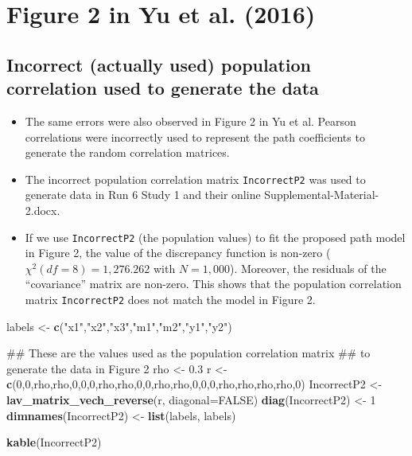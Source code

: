 \documentclass[]{article}
\newenvironment{Shaded}{\begin{snugshade}}{\end{snugshade}}
\newcommand{\KeywordTok}[1]{\textcolor[rgb]{0.13,0.29,0.53}{\textbf{#1}}}
\newcommand{\DataTypeTok}[1]{\textcolor[rgb]{0.13,0.29,0.53}{#1}}
\newcommand{\DecValTok}[1]{\textcolor[rgb]{0.00,0.00,0.81}{#1}}
\newcommand{\FloatTok}[1]{\textcolor[rgb]{0.00,0.00,0.81}{#1}}
\newcommand{\StringTok}[1]{\textcolor[rgb]{0.31,0.60,0.02}{#1}}
\newcommand{\OtherTok}[1]{\textcolor[rgb]{0.56,0.35,0.01}{#1}}
\newcommand{\NormalTok}[1]{#1}
\providecommand{\tightlist}{%
  \setlength{\itemsep}{0pt}\setlength{\parskip}{0pt}}
\begin{document}
\section{Figure 2 in Yu et al. (2016)}\label{figure-2-in-yu-et-al.-2016}

\subsection{Incorrect (actually used) population correlation used to
generate the
data}\label{incorrect-actually-used-population-correlation-used-to-generate-the-data-1}

\begin{itemize}
\tightlist
\item
  The same errors were also observed in Figure 2 in Yu et al. Pearson
  correlations were incorrectly used to represent the path coefficients
  to generate the random correlation matrices.
\item
  The incorrect population correlation matrix \texttt{IncorrectP2} was
  used to generate data in Run 6 Study 1 and their online
  Supplemental-Material-2.docx.
\item
  If we use \texttt{IncorrectP2} (the population values) to fit the
  proposed path model in Figure 2, the value of the discrepancy function
  is non-zero (\(\chi^2(df=8)=1,276.262\) with \(N=1,000\)). Moreover,
  the residuals of the ``covariance'' matrix are non-zero. This shows
  that the population correlation matrix \texttt{IncorrectP2} does not
  match the model in Figure 2.
\end{itemize}

\begin{Shaded}
\begin{Highlighting}[]
\NormalTok{labels <-}\StringTok{ }\KeywordTok{c}\NormalTok{(}\StringTok{"x1"}\NormalTok{,}\StringTok{"x2"}\NormalTok{,}\StringTok{"x3"}\NormalTok{,}\StringTok{"m1"}\NormalTok{,}\StringTok{"m2"}\NormalTok{,}\StringTok{"y1"}\NormalTok{,}\StringTok{"y2"}\NormalTok{)}

\NormalTok{## These are the values used as the population correlation matrix }
\NormalTok{## to generate the data in Figure 2}
\NormalTok{rho <-}\StringTok{ }\FloatTok{0.3}
\NormalTok{r <-}\StringTok{ }\KeywordTok{c}\NormalTok{(}\DecValTok{0}\NormalTok{,}\DecValTok{0}\NormalTok{,rho,rho,}\DecValTok{0}\NormalTok{,}\DecValTok{0}\NormalTok{,}\DecValTok{0}\NormalTok{,rho,rho,}\DecValTok{0}\NormalTok{,}\DecValTok{0}\NormalTok{,rho,rho,}\DecValTok{0}\NormalTok{,}\DecValTok{0}\NormalTok{,}\DecValTok{0}\NormalTok{,rho,rho,rho,rho,}\DecValTok{0}\NormalTok{)}
\NormalTok{IncorrectP2 <-}\StringTok{ }\KeywordTok{lav_matrix_vech_reverse}\NormalTok{(r, }\DataTypeTok{diagonal=}\OtherTok{FALSE}\NormalTok{)}
\KeywordTok{diag}\NormalTok{(IncorrectP2) <-}\StringTok{ }\DecValTok{1}
\KeywordTok{dimnames}\NormalTok{(IncorrectP2) <-}\StringTok{ }\KeywordTok{list}\NormalTok{(labels, labels)}

\KeywordTok{kable}\NormalTok{(IncorrectP2)}
\end{Highlighting}
\end{Shaded}
\end{document}
